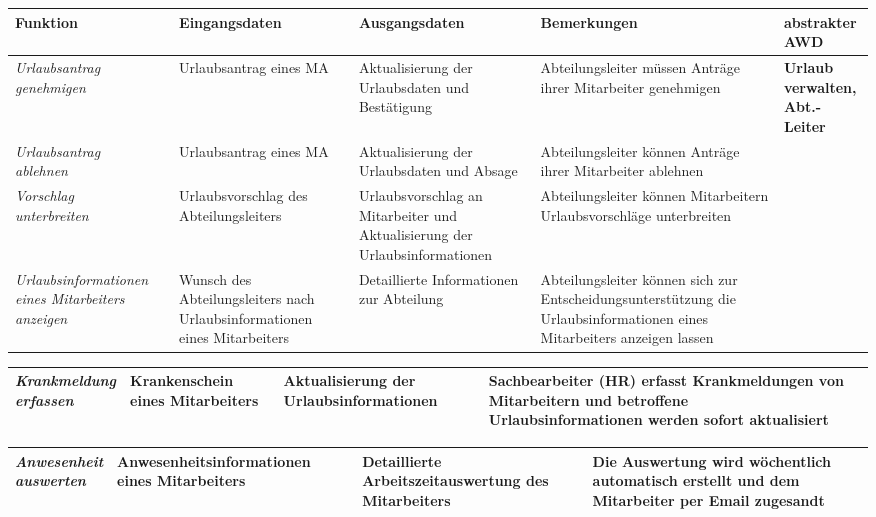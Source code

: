 {
\hspace{-3,5cm}
\footnotesize
\begin{tabular}{|p{3cm}|p{4cm}|p{4cm}|p{4cm}|p{2cm}|}
	\hline 
		\textbf{Funktion	} &	
		\textbf{Eingangsdaten} &
		\textbf{Ausgangsdaten}& 
		\textbf{Bemerkungen}	&
		\textbf{abstrakter AWD} \\
	\hline \hline 
		\textit{Urlaubsantrag \newline genehmigen} &
		Urlaubsantrag eines MA &
		Aktualisierung der Urlaubsdaten und Best\"atigung &
		Abteilungsleiter m\"ussen Antr\"age ihrer Mitarbeiter genehmigen &
		\textbf{Urlaub \newline verwalten, \newline  Abt.-Leiter } \\
	\cline{1-4}
		\textit{Urlaubsantrag \newline ablehnen} &
		Urlaubsantrag eines MA &
		Aktualisierung der Urlaubsdaten und Absage&
		Abteilungsleiter k\"onnen Antr\"age ihrer Mitarbeiter ablehnen &
		\\
	\cline{1-4}
		\textit{Vorschlag \newline unterbreiten} &
		Urlaubsvorschlag des Abteilungsleiters &
		Urlaubsvorschlag an Mitarbeiter und Aktualisierung der Urlaubsinformationen &
		Abteilungsleiter k\"onnen Mitarbeitern Urlaubsvorschl\"age unterbreiten &
		\\
	\cline{1-4}
		\textit{Urlaubsinformationen eines Mitarbeiters an\-zeigen} &
		Wunsch des Abteilungsleiters nach Urlaubsinformationen eines Mitarbeiters &
		Detaillierte Informationen zur Abteilung &
		Abteilungsleiter k\"onnen sich zur Entscheidungs\-unterst\"utzung die Urlaubs\-informationen eines Mitarbeiters anzeigen lassen &
		\\
	\hline
\end{tabular}
}

{
\vspace{0,5cm}
\hspace{-3,5cm}
\footnotesize
\begin{tabular}{|p{3cm}|p{4cm}|p{4cm}|p{4cm}|p{2cm}|}
	\hline 
		\textit{Krankmeldung \newline erfassen} &
		Krankenschein eines Mitarbeiters &
		Aktualisierung der Urlaubsinformationen &
		Sachbearbeiter (HR) erfasst Krankmeldungen von Mitarbeitern und betroffene Urlaubsinformationen werden sofort aktualisiert &
		 \\
	\hline	
\end{tabular}
}

{
\vspace{0,5cm}
\hspace{-3,5cm}
\footnotesize
\begin{tabular}{|p{3cm}|p{4cm}|p{4cm}|p{4cm}|p{2cm}|}
	\hline 
		\textit{Anwesenheit \newline auswerten} &
		Anwesenheitsinformationen eines Mitarbeiters &
		Detaillierte Arbeitszeit\-aus\-wertung  des Mitarbeiters &
		Die Auswertung wird w\"ochentlich automatisch erstellt und dem Mitarbeiter per Email zugesandt &
		 \\
	\hline	
\end{tabular}
}


